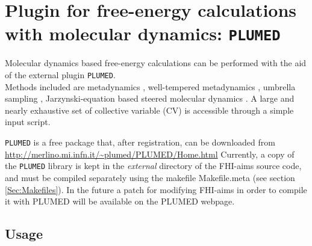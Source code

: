 % 

\section{Plugin for free-energy calculations with molecular dynamics: \texttt{PLUMED}}
\label{appendix_PLUMED}


Molecular dynamics based free-energy calculations can be performed
with the aid of the external plugin \texttt{PLUMED}.\\
Methods included are metadynamics \cite{mtd}, well-tempered metadynamics \cite{wmtd}, umbrella sampling \cite{usa1,usa2,usa3}, Jarzynski-equation based steered molecular dynamics \cite{smd1,smd2}.
A large and nearly exhaustive set of collective variable (CV) is accessible through a simple input script.

\texttt{PLUMED} is a free package that, after registration, can be downloaded from 
\url{http://merlino.mi.infn.it/~plumed/PLUMED/Home.html}
Currently, a copy of the \texttt{PLUMED} library is
kept in the \emph{external} directory of the FHI-aims source code, and
must be compiled separately using the makefile Makefile.meta (see section
\ref{Sec:Makefiles}). In the future a patch for modifying FHI-aims in order to compile it with PLUMED will be available on the PLUMED webpage.\\

\subsection{Usage}

